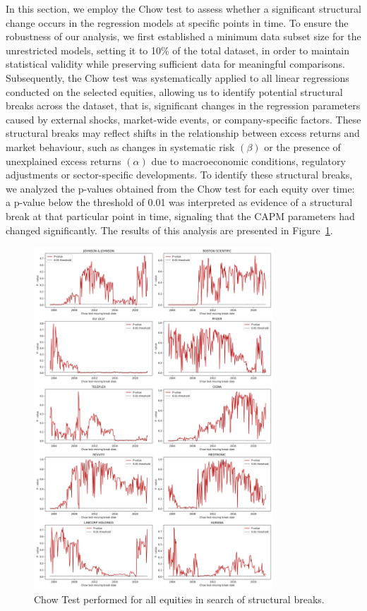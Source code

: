 \documentclass[12pt, openright, twoside]{report}
\begin{document}
In this section, we employ the Chow test to assess whether a significant structural change occurs in the regression models at 
specific points in time. 
To ensure the robustness of our analysis, we first established a minimum data subset size for the unrestricted models, 
setting it to 10\% of the total dataset, in order to maintain statistical validity while preserving sufficient data for
meaningful comparisons.
Subsequently, the Chow test was systematically applied to all linear regressions conducted on the selected equities, 
allowing us to identify potential structural breaks across the dataset, that is, significant changes in the regression
parameters caused by external shocks, market-wide events, or company-specific factors. 
These structural breaks may reflect shifts in the relationship between excess returns and market behaviour, such as changes in
systematic risk $(\beta)$ or the presence of unexplained excess returns $(\alpha)$ due to macroeconomic conditions, regulatory 
adjustments or sector-specific developments.
To identify these structural breaks, we analyzed the p-values obtained from the Chow test for each equity over time: 
a p-value below the threshold of 0.01 was interpreted as evidence of a structural break at that particular point in time,
signaling that the CAPM parameters had changed significantly.
The results of this analysis are presented in Figure~\ref{fig:chowmoving}.

\begin{figure}[h]
    \centering
    \includegraphics[width=0.8\textwidth]{images/chowmoving.png}
    \caption{Chow Test performed for all equities in search of structural breaks.}\label{fig:chowmoving}
\end{figure}
\end{document}
